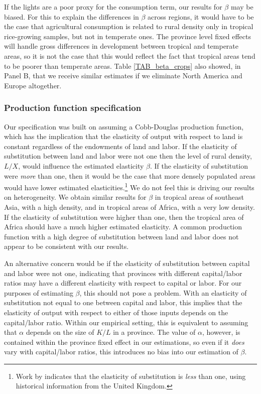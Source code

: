 \documentclass[11pt]{article}
\begin{document}
If the lights are a poor proxy for the consumption term, our results for $\beta$ may be biased. For this to explain the differences in $\beta$ across regions, it would have to be the case that agricultural consumption is related to rural density only in tropical rice-growing samples, but not in temperate ones. The province level fixed effects will handle gross differences in development between tropical and temperate areas, so it is not the case that this would reflect the fact that tropical areas tend to be poorer than temperate areas. Table \ref{TAB_beta_crops} also showed, in Panel B, that we receive similar estimates if we eliminate North America and Europe altogether. 

\subsubsection{Production function specification} 
Our specification was built on assuming a Cobb-Douglas production function, which has the implication that the elasticity of output with respect to land is constant regardless of the endowments of land and labor. If the elasticity of substitution between land and labor were not one then the level of rural density, $L/X$, would influence the estimated elasticity $\beta$. If the elasticity of substitution were \textit{more} than one, then it would be the case that more densely populated areas would have lower estimated elasticities.\footnote{Work by \citet{wilde2012} indicates that the elasticity of substitution is \textit{less} than one, using historical information from the United Kingdom.} We do not feel this is driving our results on heterogeneity. We obtain similar results for $\beta$ in tropical areas of southeast Asia, with a high density, and in tropical areas of Africa, with a very low density. If the elasticity of substitution were higher than one, then the tropical area of Africa should have a much higher estimated elasticity. A common production function with a high degree of substitution between land and labor does not appear to be consistent with our results.

An alternative concern would be if the elasticity of substitution between capital and labor were not one, indicating that provinces with different capital/labor ratios may have a different elasticity with respect to capital or labor. For our purposes of estimating $\beta$, this should not pose a problem. With an elasticity of substitution not equal to one between capital and labor, this implies that the elasticity of output with respect to either of those inputs depends on the capital/labor ratio. Within our empirical setting, this is equivalent to assuming that $\alpha$ depends on the size of $K/L$ in a province. The value of $\alpha$, however, is contained within the province fixed effect in our estimations, so even if it \textit{does} vary with capital/labor ratios, this introduces no bias into our estimation of $\beta$.
\end{document}
